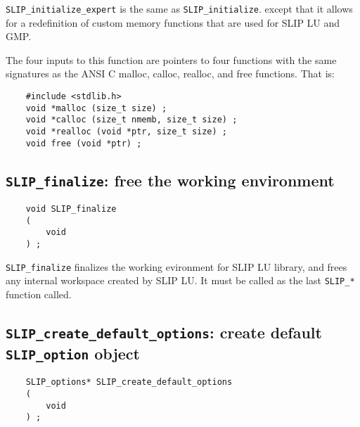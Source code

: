 \documentclass[12pt]{article}
\theoremstyle{definition}
\begin{document}
\verb|SLIP_initialize_expert| is the same as \verb|SLIP_initialize|. except
that it allows for a redefinition of custom memory functions that are used for
SLIP LU and GMP.

The four inputs to this function are pointers to four functions with the
same signatures as the ANSI C malloc, calloc, realloc, and free functions.
That is:

\begin{mdframed}[userdefinedwidth=6in]
{\footnotesize
\begin{verbatim}
    #include <stdlib.h>
    void *malloc (size_t size) ;
    void *calloc (size_t nmemb, size_t size) ;
    void *realloc (void *ptr, size_t size) ;
    void free (void *ptr) ;
\end{verbatim}
} \end{mdframed}

\cprotect\subsection{\verb|SLIP_finalize|: free the working environment}
\label{ss:SLIP_finalize}

\begin{mdframed}[userdefinedwidth=6in]
{\footnotesize
\begin{verbatim}
    void SLIP_finalize
    (
        void
    ) ;
\end{verbatim}
} \end{mdframed}

\verb|SLIP_finalize| finalizes the working evironment for SLIP LU
library, and frees any internal workspace created by SLIP LU.  It must be
called as the last \verb|SLIP_*| function called.

\cprotect\subsection{\verb|SLIP_create_default_options|: create default \verb|SLIP_option| object}
\label{ss:create_default_options}

\begin{mdframed}[userdefinedwidth=6in]
{\footnotesize
\begin{verbatim}
    SLIP_options* SLIP_create_default_options
    (
        void
    ) ;
\end{verbatim}
} \end{mdframed}
\end{document}
